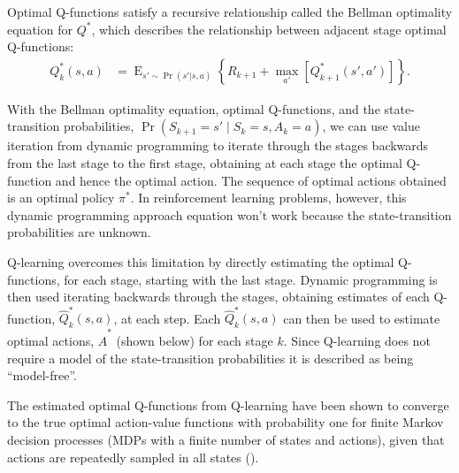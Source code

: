 \documentclass[12pt]{article}
\begin{document}
Optimal Q-functions satisfy a recursive relationship called the Bellman optimality equation for \( Q^{*} \), which describes the relationship between adjacent stage optimal Q-functions:
\begin{align}
  Q_{k}^{*}(s,a) &= \operatorname{E}_{s'\sim\Pr(s'|s,a)}\left\{ R_{k+1}+\max_{a'} [Q_{k+1}^{*}(s',a')] \right\}\label{eq:q_dp_operator}.
\end{align}

With the Bellman optimality equation, optimal Q-functions, and the state-transition probabilities, \( \Pr(S_{k+1} = s' \mid S_k = s, A_k = a) \), we can use value iteration from dynamic programming to iterate through the stages backwards from the last stage to the first stage, obtaining at each stage the optimal Q-function and hence the optimal action. The sequence of optimal actions obtained is an optimal policy \( \pi^{*} \). In reinforcement learning problems, however, this dynamic programming approach equation won't work because the state-transition probabilities are unknown.

Q-learning overcomes this limitation by directly estimating the optimal Q-functions, for each stage, starting with the last stage. Dynamic programming is then used iterating backwards through the stages, obtaining estimates of each Q-function, \( \hat{Q}^{*}_{k}(s, a) \), at each step. Each \( \hat{Q}^{*}_{k}(s, a) \) can then be used to estimate optimal actions, \( \hat{A}^{*} \) (shown below) for each stage \( k \). Since Q-learning does not require a model of the state-transition probabilities it is described as being ``model-free''.

The estimated optimal Q-functions from Q-learning have been shown to converge to the true optimal action-value functions with probability one for finite Markov decision processes (MDPs with a finite number of states and actions), given that actions are repeatedly sampled in all states (\cite{Watkins1992}).
\end{document}
